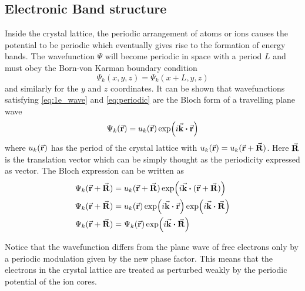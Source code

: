 \subsection{Electronic Band structure} \label{sec:bands}
Inside the crystal lattice, the periodic arrangement of atoms or ions causes the potential to be periodic which eventually gives rise to the formation of energy bands. The wavefunction $\Psi$ will become periodic in space with a period $L$ and must obey the Born-von Karman boundary condition \citep{Herman1959}
\begin{equation} \label{eq:periodic}
	\Psi_k(x,y,z) = \Psi_k(x + L, y, z)
\end{equation}
and similarly for the $y$ and $z$ coordinates. It can be shown that wavefunctions satisfying \eqref{eq:1e_wave} and \eqref{eq:periodic} are the Bloch form of a travelling plane wave
\begin{equation} \label{eq:Bloch}
	\Psi_k(\va{r}) = u_k(\va{r}) \exp(i \va{k} \vdot \va{r})
\end{equation}
where $u_k(\va{r})$ has the period of the crystal lattice with $u_k(\va{r}) = u_k(\va{r} + \va{R})$. Here $\va{R}$ is the translation vector which can be simply thought as the periodicity expressed as vector.  The Bloch expression can be written as
\begin{align}
	\Psi_k(\va{r} + \va{R}) & = u_k(\va{r} + \va{R}) \exp(i \va{k} \vdot (\va{r} + \va{R}))  \notag         \\
	\Psi_k(\va{r} + \va{R}) & = u_k(\va{r}) \exp(i \va{k} \vdot \va{r})  \exp(i \va{k} \vdot \va{R}) \notag \\
	\Psi_k(\va{r} + \va{R}) & = \Psi_k(\va{r}) \exp(i \va{k} \vdot \va{R})
\end{align}

Notice that the wavefunction differs from the plane wave of free electrons only by a periodic modulation given by the new phase factor. This means that the electrons in the crystal lattice are treated as perturbed weakly by the periodic potential of the ion cores.


